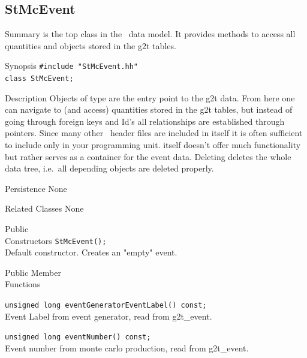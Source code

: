 \subsection{StMcEvent}
\label{sec:StMcEvent}
\begin{Entry}
\item[Summary]
     is the top class in the \StMcEvent\ data model.
    It provides methods to access all quantities and objects
    stored in the g2t tables.

\item[Synopsis]
    \verb+#include "StMcEvent.hh"+\\
    \verb+class StMcEvent;+\\

\item[Description]
    Objects of type  are the entry point to the g2t data.
    From here one can navigate to (and access) quantities stored
    in the g2t tables, but instead of going through foreign keys and
     Id's all relationships are established through pointers.
    Since many other \StMcEvent\ header files are included
    in  itself it is often sufficient to include only
     in your programming unit.
     itself doesn't offer much functionality but rather serves
    as a container for the event data.
    Deleting  deletes the whole data tree, i.e.~all depending objects
    are deleted properly.

\item[Persistence]
    None

\item[Related Classes]
    None

\item[Public\\ Constructors]
    \verb+StMcEvent();+\\
    Default constructor. Creates an "empty" event.

\item[Public Member\\ Functions]
    

    \verb+unsigned long eventGeneratorEventLabel() const;+\\
    Event Label from event generator, read from g2t\_event.

    \verb+unsigned long eventNumber() const;+\\
    Event number from monte carlo production, read from g2t\_event.


\end{Entry}
